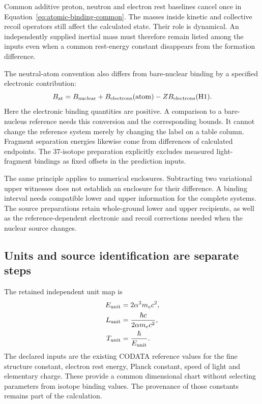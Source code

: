 Common additive proton, neutron and electron rest baselines cancel once in Equation~\eqref{eq:atomic-binding-common}. The masses inside kinetic and collective recoil operators still affect the calculated state. Their role is dynamical. An independently supplied inertial mass must therefore remain listed among the inputs even when a common rest-energy constant disappears from the formation difference.

The neutral-atom convention also differs from bare-nuclear binding by a specified electronic contribution:
\begin{equation}
B_{\rm at}=B_{\rm nuclear}+B_{\rm electrons}(\mathrm{atom})-ZB_{\rm electrons}(\mathrm{H1}).
\end{equation}
Here the electronic binding quantities are positive. A comparison to a bare-nucleus reference needs this conversion and the corresponding bounds. It cannot change the reference system merely by changing the label on a table column. Fragment separation energies likewise come from differences of calculated endpoints. The 37-isotope preparation explicitly excludes measured light-fragment bindings as fixed offsets in the prediction inputs.

The same principle applies to numerical enclosures. Subtracting two variational upper witnesses does not establish an enclosure for their difference. A binding interval needs compatible lower and upper information for the complete systems. The source preparations retain whole-ground lower and upper recipients, as well as the reference-dependent electronic and recoil corrections needed when the nuclear source changes.

\subsection{Units and source identification are separate steps}

The retained independent unit map is
\begin{align}
E_{\rm unit}&=2\alpha^2m_ec^2,\\
L_{\rm unit}&=\frac{\hbar c}{2\alpha m_ec^2},\\
T_{\rm unit}&=\frac{\hbar}{E_{\rm unit}}.
\end{align}
The declared inputs are the existing CODATA reference values for the fine structure constant, electron rest energy, Planck constant, speed of light and elementary charge. These provide a common dimensional chart without selecting parameters from isotope binding values. The provenance of those constants remains part of the calculation.

